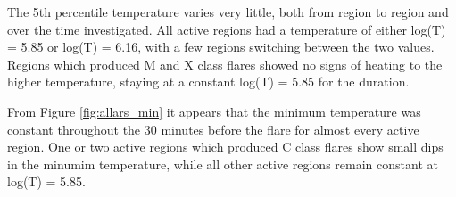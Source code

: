 \documentclass[referee,a4paper,12pt]{swsc}
\begin{document}
\begin{linenumbers}
The 5th percentile temperature varies very little, both from region to region and over the time investigated.
All active regions had a temperature of either log(T) = 5.85 or log(T) = 6.16, with a few regions switching between the two values.
Regions which produced M and X class flares showed no signs of heating to the higher temperature, staying at a constant log(T) = 5.85 for the duration.

From Figure \ref{fig:allars_min} it appears that the minimum temperature was constant throughout the 30 minutes before the flare for almost every active region.
One or two active regions which produced C class flares show small dips in the minumim temperature, while all other active regions remain constant at log(T) = 5.85.


\end{linenumbers}
\end{document}
